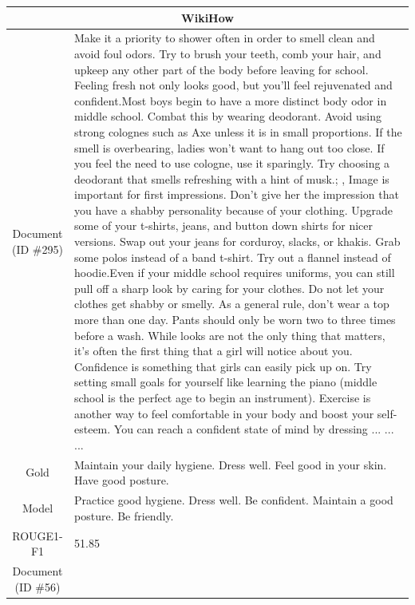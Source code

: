 \begin{table}[bth!]
\scriptsize
\centering
\renewcommand{\arraystretch}{1.3}
\begin{tabular}{c|p{}}
\hline
\multicolumn{2}{c}{WikiHow} \\ \hline
\makecell{Document\\(ID \#295)} & 
Make it a priority to shower often in order to smell clean and avoid foul odors. Try to brush your teeth, comb your hair, and upkeep any other part of the body before leaving for school. Feeling fresh not only looks good, but you’ll feel rejuvenated and confident.Most boys begin to have a more distinct body odor in middle school. Combat this by wearing deodorant. Avoid using strong colognes such as Axe unless it is in small proportions. If the smell is overbearing, ladies won’t want to hang out too close. If you feel the need to use cologne, use it sparingly. Try choosing a deodorant that smells refreshing with a hint of musk.; , Image is important for first impressions. Don’t give her the impression that you have a shabby personality because of your clothing. Upgrade some of your t-shirts, jeans, and button down shirts for nicer versions. Swap out your jeans for corduroy, slacks, or khakis. Grab some polos instead of a band t-shirt. Try out a flannel instead of hoodie.Even if your middle school requires uniforms, you can still pull off a sharp look by caring for your clothes. Do not let your clothes get shabby or smelly. As a general rule, don’t wear a top more than one day. Pants should only be worn two to three times before a wash. While looks are not the only thing that matters, it’s often the first thing that a girl will notice about you. Confidence is something that girls can easily pick up on. Try setting small goals for yourself like learning the piano (middle school is the perfect age to begin an instrument). Exercise is another way to feel comfortable in your body and boost your self-esteem. You can reach a confident state of mind by dressing ... ... ... 
\\ \hline
Gold & 
Maintain your daily hygiene. Dress well. Feel good in your skin. Have good posture.
\\ \hline
Model & 
Practice good hygiene. Dress well. Be confident. Maintain a good posture. Be friendly.
\\ \hline
ROUGE1-F1 & 
51.85
\\ \hline
\makecell{Document\\(ID \#56)} & 

\end{tabular}
\end{table}
